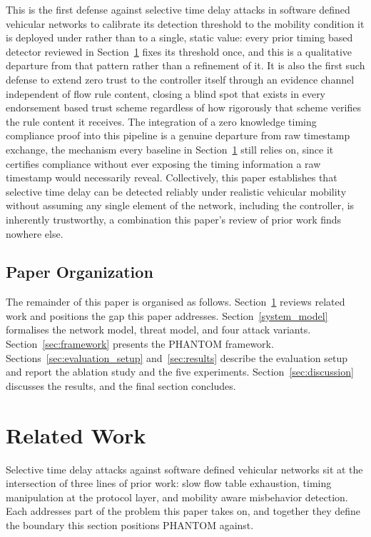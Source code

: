 \documentclass[final,5p,twocolumn]{elsarticle}
\theoremstyle{remark}
\theoremstyle{plain}
\begin{document}
This is the first defense against selective time delay attacks in
software defined vehicular networks to calibrate its detection threshold
to the mobility condition it is deployed under rather than to a single,
static value: every prior timing based detector reviewed in
Section~\ref{sec:related} fixes its threshold once, and this is a
qualitative departure from that pattern rather than a refinement of it.
It is also the first such defense to extend zero trust to the controller
itself through an evidence channel independent of flow rule content,
closing a blind spot that exists in every endorsement based trust scheme
regardless of how rigorously that scheme verifies the rule content it
receives. The integration of a zero knowledge timing compliance proof
into this pipeline is a genuine departure from raw timestamp exchange,
the mechanism every baseline in Section~\ref{sec:related} still relies
on, since it certifies compliance without ever exposing the timing
information a raw timestamp would necessarily reveal. Collectively, this
paper establishes that selective time delay can be detected reliably
under realistic vehicular mobility without assuming any single element of
the network, including the controller, is inherently trustworthy, a
combination this paper's review of prior work finds nowhere else.

\subsection{Paper Organization}

The remainder of this paper is organised as follows. Section~\ref{sec:related}
reviews related work and positions the gap this paper addresses.
Section~\ref{system_model} formalises the network model, threat model,
and four attack variants. Section~\ref{sec:framework} presents the
PHANTOM framework. Sections~\ref{sec:evaluation_setup}
and~\ref{sec:results} describe the evaluation setup and report the ablation study and the five
experiments. Section~\ref{sec:discussion} discusses the results, and the
final section concludes.


\section{Related Work}
\label{sec:related}

Selective time delay attacks against software defined vehicular networks sit
at the intersection of three lines of prior work: slow flow table exhaustion,
timing manipulation at the protocol layer, and mobility aware misbehavior
detection. Each addresses part of the problem this paper takes on, and
together they define the boundary this section positions PHANTOM against.
\end{document}
